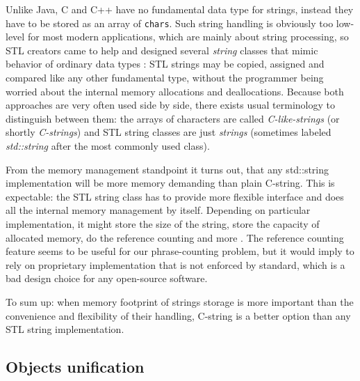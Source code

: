 Unlike Java, C and C++ have no fundamental data type for strings, instead they have
to be stored as an array of \verb|chars|.
Such string handling is obviously too low-level for most modern applications,
which are mainly about string processing, so STL creators came to help and designed
several \emph{string} classes that mimic behavior of ordinary data types
\citep[Chapter 11]{josuttis:stl}:
STL strings may be copied, assigned and compared like any other fundamental type,
without the programmer being worried about the internal memory allocations and deallocations.
Because both approaches are very often used side by side, there exists usual terminology to
distinguish between them:
the arrays of characters are called \emph{C-like-strings} (or shortly \emph{C-strings}) and
STL string classes are just \emph{strings} (sometimes labeled \emph{std::string} after the
most commonly used class).

From the memory management standpoint it turns out, that any std::string
implementation will be more memory demanding than plain C-string.
This is expectable: the STL string class has to provide more flexible interface
and does all the internal memory management by itself.
Depending on particular implementation, it might store the size of the string,
store the capacity of allocated memory, do the reference counting and more
\citep[Item 15]{meyers:effectivestl}.
The reference counting feature seems to be useful for our phrase-counting problem,
but it would imply to rely on proprietary implementation that is not enforced by
standard, which is a bad design choice for any open-source software.

To sum up: when memory footprint of strings storage is more important than
the convenience and flexibility of their handling, C-string is a better option
than any STL string implementation.

\subsection{Objects unification}

